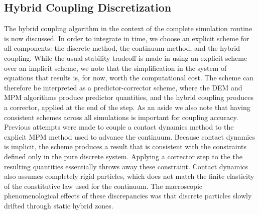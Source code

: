 \subsection{Hybrid Coupling Discretization} \label{subsec:hybrid_coupling_discretization}
The hybrid coupling algorithm in the context of the complete simulation routine is now discussed. In order to integrate in time, we choose an explicit scheme for all components: the discrete method, the continuum method, and the hybrid coupling. While the usual stability tradeoff is made in using an explicit scheme over an implicit scheme, we note that the simplification in the system of equations that results is, for now, worth the computational cost. The scheme can therefore be interpreted as a predictor-corrector scheme, where the DEM and MPM algorithms produce predictor quantities, and the hybrid coupling produces a corrector, applied at the end of the step. As an aside we also note that having consistent schemes across all simulations is important for coupling accuracy. Previous attempts were made to couple a contact dynamics method to the explicit MPM method used to advance the continuum. Because contact dynamics is implicit, the scheme produces a result that is consistent with the constraints defined only in the pure discrete system. Applying a corrector step to the the resulting quantities essentially throws away these constraint. Contact dynamics also assumes completely rigid particles, which does not match the finite elasticity of the constitutive law used for the continuum. The macroscopic phenomenological effects of these discrepancies was that discrete particles slowly drifted through static hybrid zones.

